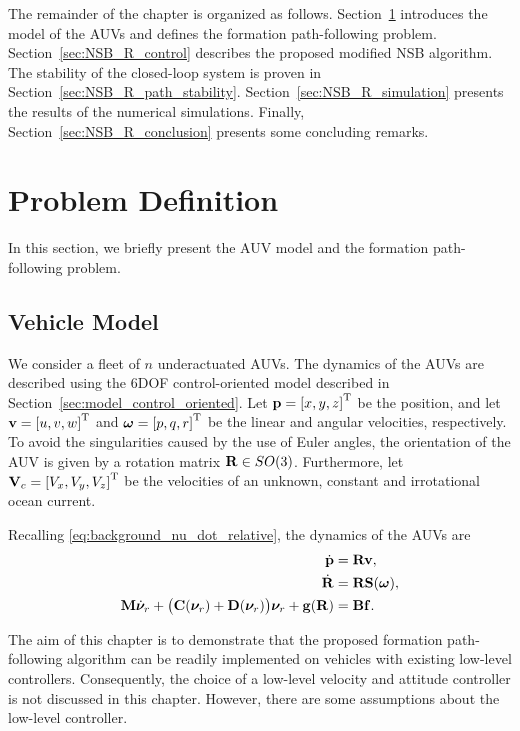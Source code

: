 The remainder of the chapter is organized as follows.
Section~\ref{sec:NSB_R_problem} introduces the model of the AUVs and defines the formation path-following problem.
Section~\ref{sec:NSB_R_control} describes the proposed modified NSB algorithm.
The stability of the closed-loop system is proven in Section~\ref{sec:NSB_R_path_stability}.
Section~\ref{sec:NSB_R_simulation} presents the results of the numerical simulations.
Finally, Section~\ref{sec:NSB_R_conclusion} presents some concluding remarks.

\section{Problem Definition}
\label{sec:NSB_R_problem}
In this section, we briefly present the AUV model and the formation path-following problem.

\subsection{Vehicle Model}
We consider a fleet of $n$ underactuated AUVs.
The dynamics of the AUVs are described using the 6DOF control-oriented model described in Section~\ref{sec:model_control_oriented}.
Let $\mathbf{p} = \left[x, y, z\right]^{\mathrm{T}}$ be the position, and let $\mathbf{v} = \left[u, v, w\right]^{\mathrm{T}}$ and $\bm{\omega} = \left[p, q, r\right]^{\mathrm{T}}$ be the linear and angular velocities, respectively.
To avoid the singularities caused by the use of Euler angles, the orientation of the AUV is given by a rotation matrix $\mathbf{R} \in SO(3)$.
Furthermore, let $\mathbf{V}_c = \left[V_x, V_y, V_z\right]^{\mathrm{T}}$ be the velocities of an unknown, constant and irrotational ocean current.

Recalling \eqref{eq:background_nu_dot_relative}, the dynamics of the AUVs are
\begin{subequations}
\begin{align}
    \dot{\mathbf{p}} &= \mathbf{R} \mathbf{v}, \label{eq:NSB_R_p_dot}\\
    \dot{\mathbf{R}} &= \mathbf{R} \mathbf{S}(\bm{\omega}), \label{eq:NSB_R_R_dot} \\
    \mathbf{M} \dot{\bm{\nu}}_r
        + \bigl(\mathbf{C}(\bm{\nu}_r) + \mathbf{D}(\bm{\nu}_r)\bigr) \bm{\nu}_r + \mathbf{g}(\mathbf{R}) &= \mathbf{B}\mathbf{f}. \label{eq:NSB_R_nu_dot}
\end{align} \label{eq:NSB_R_matrix_vector_model}
\end{subequations}

The aim of this chapter is to demonstrate that the proposed formation path-following algorithm can be readily implemented on vehicles with existing low-level controllers.
Consequently, the choice of a low-level velocity and attitude controller is not discussed in this chapter.
However, there are some assumptions about the low-level controller.

